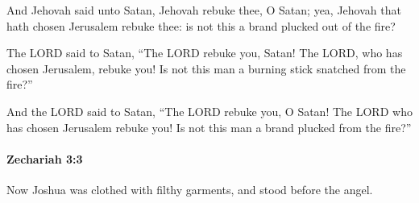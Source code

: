 			\begin{versebox}
					\item[BHS] 
					\item[LXX] 
					\item[ASV] And Jehovah said unto Satan, Jehovah rebuke thee, O Satan; yea, Jehovah that hath chosen Jerusalem rebuke thee: is not this a brand plucked out of the fire?
					\item[NIV] The LORD said to Satan, “The LORD rebuke you, Satan! The LORD, who has chosen Jerusalem, rebuke you! Is not this man a burning stick snatched from the fire?”
					\item[NRSV] And the LORD said to Satan, “The LORD rebuke you, O Satan! The LORD who has chosen Jerusalem rebuke you! Is not this man a brand plucked from the fire?”
			\end{versebox}

		\paragraph{Zechariah 3:3} %
			\label{ZECHARIAH-3-3}

			Now Joshua was clothed with filthy garments, and stood before the angel.

